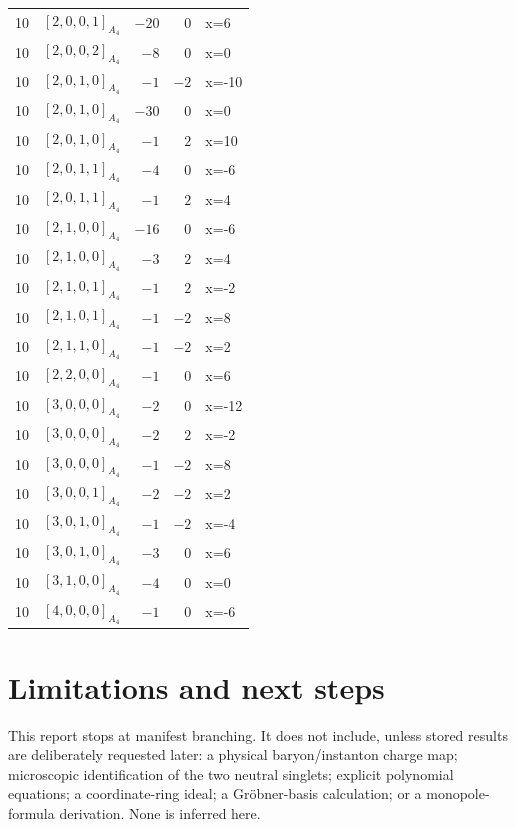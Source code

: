 \documentclass[11pt]{article}
\newcommand{\Dynkin}[1]{#1}
\begin{document}
\begin{longtable}{r l r r l}
10 & $\Dynkin{[2,0,0,1]_{A_4}}$ & $-20$ & $0$ & x=6\\
10 & $\Dynkin{[2,0,0,2]_{A_4}}$ & $-8$ & $0$ & x=0\\
10 & $\Dynkin{[2,0,1,0]_{A_4}}$ & $-1$ & $-2$ & x=-10\\
10 & $\Dynkin{[2,0,1,0]_{A_4}}$ & $-30$ & $0$ & x=0\\
10 & $\Dynkin{[2,0,1,0]_{A_4}}$ & $-1$ & $2$ & x=10\\
10 & $\Dynkin{[2,0,1,1]_{A_4}}$ & $-4$ & $0$ & x=-6\\
10 & $\Dynkin{[2,0,1,1]_{A_4}}$ & $-1$ & $2$ & x=4\\
10 & $\Dynkin{[2,1,0,0]_{A_4}}$ & $-16$ & $0$ & x=-6\\
10 & $\Dynkin{[2,1,0,0]_{A_4}}$ & $-3$ & $2$ & x=4\\
10 & $\Dynkin{[2,1,0,1]_{A_4}}$ & $-1$ & $2$ & x=-2\\
10 & $\Dynkin{[2,1,0,1]_{A_4}}$ & $-1$ & $-2$ & x=8\\
10 & $\Dynkin{[2,1,1,0]_{A_4}}$ & $-1$ & $-2$ & x=2\\
10 & $\Dynkin{[2,2,0,0]_{A_4}}$ & $-1$ & $0$ & x=6\\
10 & $\Dynkin{[3,0,0,0]_{A_4}}$ & $-2$ & $0$ & x=-12\\
10 & $\Dynkin{[3,0,0,0]_{A_4}}$ & $-2$ & $2$ & x=-2\\
10 & $\Dynkin{[3,0,0,0]_{A_4}}$ & $-1$ & $-2$ & x=8\\
10 & $\Dynkin{[3,0,0,1]_{A_4}}$ & $-2$ & $-2$ & x=2\\
10 & $\Dynkin{[3,0,1,0]_{A_4}}$ & $-1$ & $-2$ & x=-4\\
10 & $\Dynkin{[3,0,1,0]_{A_4}}$ & $-3$ & $0$ & x=6\\
10 & $\Dynkin{[3,1,0,0]_{A_4}}$ & $-4$ & $0$ & x=0\\
10 & $\Dynkin{[4,0,0,0]_{A_4}}$ & $-1$ & $0$ & x=-6\\
\bottomrule\end{longtable}
\section{Limitations and next steps}
This report stops at manifest branching. It does not include, unless stored results are deliberately requested later: a physical baryon/instanton charge map; microscopic identification of the two neutral singlets; explicit polynomial equations; a coordinate-ring ideal; a Gr\"obner-basis calculation; or a monopole-formula derivation. None is inferred here.
\end{document}
